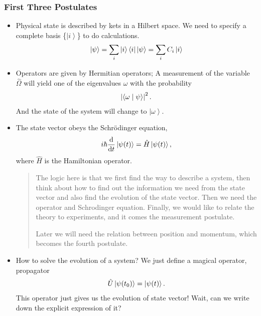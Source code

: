 \documentclass[letterpaper,10pt,english]{sphinxmanual}
\def\d{{\rm d}}
\newcommand{\bra}[1]{\left\langle #1\right|}
\newcommand{\ket}[1]{\left| #1\right\rangle}
\newcommand{\braket}[2]{\langle #1 \mid #2 \rangle}
\begin{document}
\subsubsection{First Three Postulates}
\label{Quantum/QuantumMechanics:first-three-postulates}\begin{itemize}
\item {} 
Physical state is described by kets in a Hilbert space. We need to specify a complete basis \{\(\ket{i}\)\} to do calculations.
\begin{gather}
\begin{split}\ket{\psi} = \sum_i \ket{i}\bra{i}\ket{\psi} = \sum_i C_i \ket{i}\end{split}\notag
\end{gather}
\item {} 
Operators are given by Hermitian operators; A measurement of the variable \(\hat \Omega\) will yield one of the eigenvalues \(\omega\) with the probability
\begin{gather}
\begin{split}\left|\braket{\omega}{\psi}\right|^2 .\end{split}\notag
\end{gather}
And the state of the system will change to \(\ket{\omega}\).

\item {} 
The state vector obeys the Schrödinger equation,
\begin{gather}
\begin{split}i\hbar \frac{\d}{\d t}\ket{\psi(t)} = \hat H \ket{\psi(t)} ,\end{split}\notag
\end{gather}
where \(\hat H\) is the Hamiltonian operator.
\begin{quote}

The logic here is that we first find the way to describe a system, then think about how to find out the information we need from the state vector and also find the evolution of the state vector. Then we need the operator and Schrodinger equation. Finally, we would like to relate the theory to experiments, and it comes the measurement postulate.

Later we will need the relation between position and momentum, which becomes the fourth postulate.
\end{quote}

\item {} 
How to solve the evolution of a system?
We just define a magical operator, propagator
\begin{gather}
\begin{split}\hat U \ket{\psi(t_0)} = \ket{\psi(t)} .\end{split}\notag
\end{gather}
This operator just gives us the evolution of state vector! Wait, can we write down the explicit expression of it?


\end{itemize}
\end{document}
